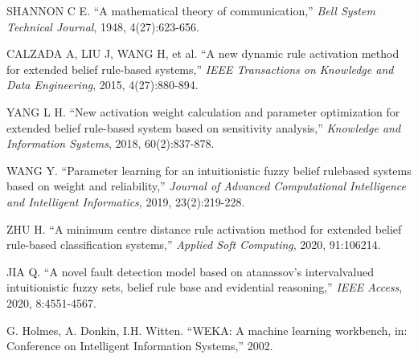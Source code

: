 \documentclass{ieeeaccess}
\begin{document}
\begin{thebibliography}{00}
     SHANNON C E. ``A mathematical theory of communication,''
    \emph{Bell System Technical Journal},
    1948, 4(27):623-656.

     CALZADA A, LIU J, WANG H, et al. ``A new dynamic rule activation
    method for extended belief rule-based systems,''
    \emph{IEEE Transactions on Knowledge and Data Engineering},
    2015, 4(27):880-894.

     YANG L H. ``New activation weight calculation and parameter optimization
    for extended belief rule-based system based on sensitivity analysis,''
    \emph{Knowledge and Information Systems},
    2018, 60(2):837-878.

     WANG Y. ``Parameter learning for an intuitionistic fuzzy belief rulebased
    systems based on weight and reliability,''
    \emph{Journal of Advanced Computational Intelligence and Intelligent Informatics},
    2019, 23(2):219-228.

     ZHU H. ``A minimum centre distance rule activation method for extended
    belief rule-based classification systems,''
    \emph{Applied Soft Computing},
    2020, 91:106214.

     JIA Q. ``A novel fault detection model based on atanassov’s intervalvalued
    intuitionistic fuzzy sets, belief rule base and evidential reasoning,''
    \emph{IEEE Access}, 2020, 8:4551-4567.

     G. Holmes, A. Donkin, I.H. Witten. ``WEKA: A machine learning workbench,
    in: Conference on Intelligent Information Systems,'' 2002.


\end{thebibliography}
\end{document}
